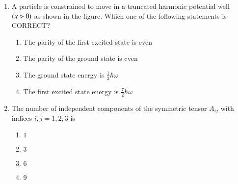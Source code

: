\documentclass[journal]{IEEEtran}
\begin{document}
\begin{enumerate}[start=14]
    \item A particle is constrained to move in a truncated harmonic potential well $\left(x > 0\right)$ as shown in the 
    figure. Which one of the following statements is CORRECT?
    \begin{figure}[H]
\centering
{}%

\label{fig:my_label}
\end{figure}

    
    \begin{enumerate}
        \item The parity of the first excited state is even 
        \item The parity of the ground state is even 
        \item The ground state energy is $\frac{1}{2} \hbar \omega$
        \item The first excited state energy is $\frac{7}{2} \hbar \omega$
    \end{enumerate}

    \item The number of independent components of the symmetric tensor $A_{ij}$ with indices $i, j = 1, 2, 3$ is
    \begin{multicols}{4}
        \begin{enumerate}
            \item $1$
            \item $3$
            \item $6$
            \item $9$
        \end{enumerate}
    \end{multicols}


\end{enumerate}
\end{document}
